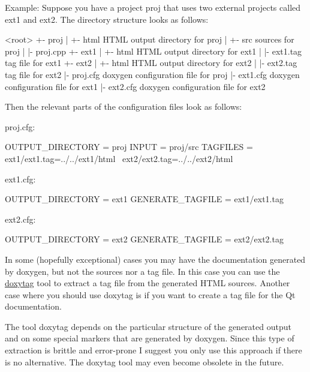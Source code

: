 \begin{DoxyParagraph}{Example: }
Suppose you have a project {\ttfamily proj} that uses two external projects called {\ttfamily ext1} and {\ttfamily ext2}. The directory structure looks as follows:
\end{DoxyParagraph}
\begin{DoxyParagraph}{}
\begin{DoxyVerb}
<root>
  +- proj
  |   +- html               HTML output directory for proj
  |   +- src                sources for proj
  |   |- proj.cpp
  +- ext1
  |   +- html               HTML output directory for ext1
  |   |- ext1.tag           tag file for ext1
  +- ext2
  |   +- html               HTML output directory for ext2
  |   |- ext2.tag           tag file for ext2
  |- proj.cfg               doxygen configuration file for proj
  |- ext1.cfg               doxygen configuration file for ext1
  |- ext2.cfg               doxygen configuration file for ext2
\end{DoxyVerb}

\end{DoxyParagraph}
\begin{DoxyParagraph}{}
Then the relevant parts of the configuration files look as follows: 
\end{DoxyParagraph}
\begin{DoxyParagraph}{}
proj.cfg: \begin{DoxyVerb}
OUTPUT_DIRECTORY  = proj
INPUT             = proj/src
TAGFILES          = ext1/ext1.tag=../../ext1/html \
                    ext2/ext2.tag=../../ext2/html 
\end{DoxyVerb}
 ext1.cfg: \begin{DoxyVerb}
OUTPUT_DIRECTORY  = ext1
GENERATE_TAGFILE  = ext1/ext1.tag 
\end{DoxyVerb}
 ext2.cfg: \begin{DoxyVerb}
OUTPUT_DIRECTORY  = ext2
GENERATE_TAGFILE  = ext2/ext2.tag
\end{DoxyVerb}

\end{DoxyParagraph}
In some (hopefully exceptional) cases you may have the documentation generated by doxygen, but not the sources nor a tag file. In this case you can use the \hyperlink{doxytag_usage}{doxytag} tool to extract a tag file from the generated HTML sources. Another case where you should use doxytag is if you want to create a tag file for the Qt documentation.

The tool {\ttfamily doxytag} depends on the particular structure of the generated output and on some special markers that are generated by doxygen. Since this type of extraction is brittle and error-\/prone I suggest you only use this approach if there is no alternative. The doxytag tool may even become obsolete in the future.

 